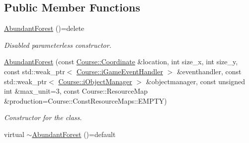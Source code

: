 \subsection*{Public Member Functions}
\begin{DoxyCompactItemize}
\item 
\hypertarget{class_student_1_1_abundant_forest_a6958c520c44d94dd7b3f02e6d647d9d4}{\hyperlink{class_student_1_1_abundant_forest_a6958c520c44d94dd7b3f02e6d647d9d4}{Abundant\-Forest} ()=delete}\label{class_student_1_1_abundant_forest_a6958c520c44d94dd7b3f02e6d647d9d4}

\begin{DoxyCompactList}\small\item\em Disabled parameterless constructor. \end{DoxyCompactList}\item 
\hyperlink{class_student_1_1_abundant_forest_af5e9c0490e427640cc1d9ffb83007279}{Abundant\-Forest} (const \hyperlink{class_course_1_1_coordinate}{Course\-::\-Coordinate} \&location, int size\-\_\-x, int size\-\_\-y, const std\-::weak\-\_\-ptr$<$ \hyperlink{class_course_1_1i_game_event_handler}{Course\-::i\-Game\-Event\-Handler} $>$ \&eventhandler, const std\-::weak\-\_\-ptr$<$ \hyperlink{class_course_1_1i_object_manager}{Course\-::i\-Object\-Manager} $>$ \&objectmanager, const unsigned int \&max\-\_\-unit=3, const Course\-::\-Resource\-Map \&production=Course\-::\-Const\-Resource\-Maps\-::\-E\-M\-P\-T\-Y)
\begin{DoxyCompactList}\small\item\em Constructor for the class. \end{DoxyCompactList}\item 
\hypertarget{class_student_1_1_abundant_forest_a13ce17841292c0eb072e2fafcdfd1b5d}{virtual \hyperlink{class_student_1_1_abundant_forest_a13ce17841292c0eb072e2fafcdfd1b5d}{$\sim$\-Abundant\-Forest} ()=default}\label{class_student_1_1_abundant_forest_a13ce17841292c0eb072e2fafcdfd1b5d}


\end{DoxyCompactItemize}
